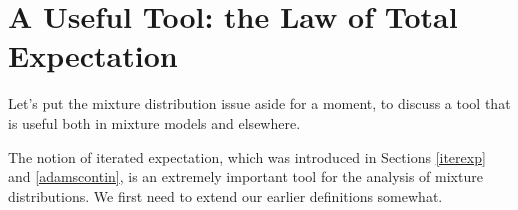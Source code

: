 % 
% 
% 
% 
% 
% 
% 
% 
% 
% 
% 

\section{A Useful Tool:  the Law of Total Expectation}
\label{lte}

Let's put the mixture distribution issue aside for a moment, to discuss
a tool that is useful both in mixture models and elsewhere.

The notion of iterated expectation, which was introduced in Sections
\ref{iterexp} and \ref{adamscontin}, is an extremely important
tool for the analysis of mixture distributions.  We first need to extend
our earlier definitions somewhat.


